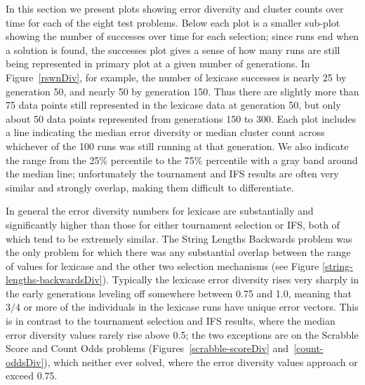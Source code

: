 In this section we present plots showing error diversity and cluster counts over time for each of
the eight test problems. Below each plot is a smaller sub-plot showing the number of successes 
over time for each selection; since runs end when a solution is found, the successes plot gives a
sense of how many runs are still being represented in primary plot at a given number of generations.
In Figure~\ref{rswnDiv}, for example, the number of lexicase successes is nearly 25 by generation
50, and nearly 50 by generation 150. Thus there are slightly more than 75 data points still represented
in the lexicase data at generation 50, but only about 50 data points represented from generations 150
to 300. Each plot includes a line indicating the median error diversity or median cluster count across
whichever of the 100 runs was still running at that generation. We also indicate the 
range from the 25\% percentile to the 75\% percentile with a gray band around the median line; 
unfortunately the tournament and IFS results are often very similar and strongly overlap, making them difficult to differentiate.

In general the error diversity numbers for lexicase are substantially and significantly
higher than those for either tournament selection or IFS, both of which tend to be extremely similar.
The String Lengths Backwards problem was the only problem for which there was any substantial overlap 
between the range of values for lexicase and the other two selection mechanisms (see 
Figure \ref{string-lengths-backwardsDiv}). Typically the lexicase error diversity rises very sharply
in the early generations leveling off somewhere between 0.75 and 1.0, meaning that $3/4$ or
more of the individuals in the lexicase runs have unique error vectors. This is in contrast
to the tournament selection and IFS results, where the median error diversity values rarely rise above
0.5; the two exceptions are on the Scrabble Score and Count Odds problems 
(Figures~\ref{scrabble-scoreDiv} and~\ref{count-oddsDiv}), which neither ever
solved, where the error diversity values approach or exceed 0.75.

